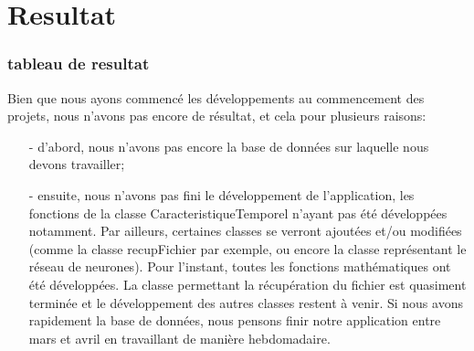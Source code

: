  \part{Resultat} %
 \label{prt:resultat_}
 
	\section{tableau de resultat} %
		\label{sec:tableau_de_resultat}
		
		Bien que nous ayons commencé les développements au commencement des projets, nous n'avons pas encore de résultat, et cela pour plusieurs raisons:
		\begin{itemize}
			\item [-] d'abord, nous n'avons pas encore la base de données sur laquelle nous devons travailler;
			\item [-]ensuite, nous n'avons pas fini le développement de l'application, les fonctions de la classe CaracteristiqueTemporel n'ayant pas été développées notamment. Par ailleurs, certaines classes se verront ajoutées et/ou modifiées (comme la classe recupFichier par exemple, ou encore la classe représentant le réseau de neurones).
		Pour l'instant, toutes les fonctions mathématiques ont été développées. La classe permettant la récupération du fichier est quasiment terminée et le développement des autres classes restent à venir.
		Si nous avons rapidement la base de données, nous pensons finir notre application entre mars et avril en travaillant de manière hebdomadaire.
		\end{itemize}


